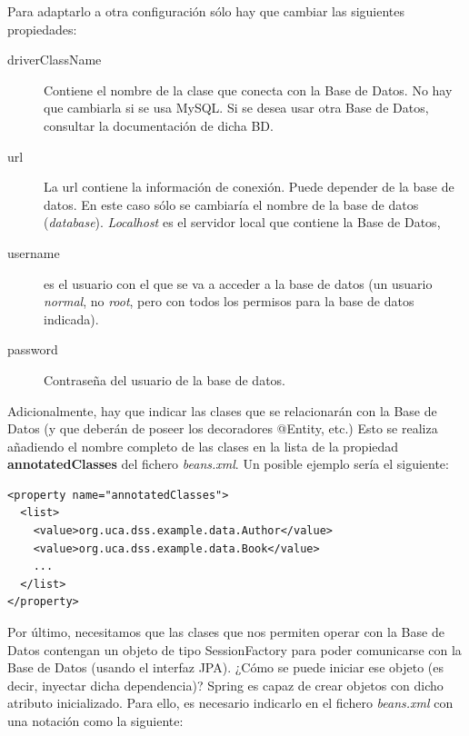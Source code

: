 \documentclass[11pt]{article}
\begin{document}
Para adaptarlo a otra configuración sólo hay que cambiar las siguientes
propiedades:

\begin{description}

\item[driverClassName] Contiene el nombre de la clase que
conecta con la Base de Datos. No hay que cambiarla si se usa MySQL. Si se
desea usar otra Base de Datos, consultar la documentación de dicha BD.

\item[url] La url contiene la información de conexión. Puede depender de la base
de datos. En este caso sólo se cambiaría el nombre de la base de datos (\emph{database}).
\emph{Localhost} es el servidor local que contiene la Base de Datos,

\item[username] es el usuario con el que se va a acceder a la base de datos (un usuario \emph{normal}, no \emph{root}, pero con todos los permisos para la base de datos indicada).

\item[password] Contraseña del usuario de la base de datos.

\end{description}

Adicionalmente, hay que indicar las clases que se relacionarán con la Base de
Datos (y que deberán de poseer los decoradores @Entity, etc.) Esto se
realiza añadiendo el nombre completo de las clases en la lista de la propiedad
\textbf{annotatedClasses} del fichero \emph{beans.xml}. Un posible ejemplo sería
el siguiente:


\begin{lstlisting}
<property name="annotatedClasses">
  <list>
    <value>org.uca.dss.example.data.Author</value>
    <value>org.uca.dss.example.data.Book</value>
    ...
  </list>
</property>
\end{lstlisting}

Por último, necesitamos que las clases que nos permiten operar con la Base de
Datos contengan un objeto de tipo \textsf{SessionFactory} para poder comunicarse
con la Base de Datos (usando el interfaz JPA). ¿Cómo se puede iniciar ese
objeto (es decir, inyectar dicha dependencia)? Spring es capaz de crear objetos con dicho atributo inicializado. Para ello, es necesario indicarlo en el fichero \emph{beans.xml} con una notación
como la siguiente:

\end{document}

